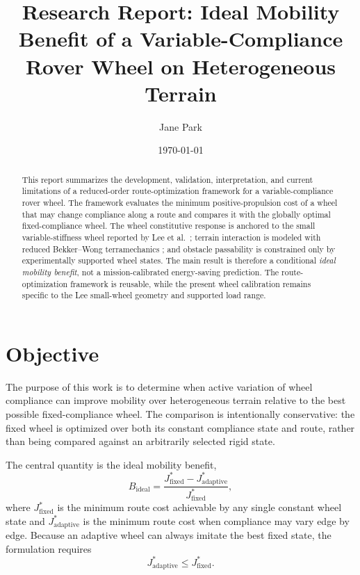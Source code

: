 \documentclass[11pt]{article}
\title{Research Report: Ideal Mobility Benefit of a Variable-Compliance Rover Wheel on Heterogeneous Terrain}
\author{Jane Park}
\date{\today}
\begin{document}
\maketitle

\begin{abstract}
This report summarizes the development, validation, interpretation, and current limitations of a reduced-order route-optimization framework for a variable-compliance rover wheel. The framework evaluates the minimum positive-propulsion cost of a wheel that may change compliance along a route and compares it with the globally optimal fixed-compliance wheel. The wheel constitutive response is anchored to the small variable-stiffness wheel reported by Lee et al.\ \cite{Lee2024}; terrain interaction is modeled with reduced Bekker--Wong terramechanics \cite{Bekker1969,Wong2001,Wong2010}; and obstacle passability is constrained only by experimentally supported wheel states. The main result is therefore a conditional \emph{ideal mobility benefit}, not a mission-calibrated energy-saving prediction. The route-optimization framework is reusable, while the present wheel calibration remains specific to the Lee small-wheel geometry and supported load range.
\end{abstract}

\section{Objective}

The purpose of this work is to determine when active variation of wheel compliance can improve mobility over heterogeneous terrain relative to the best possible fixed-compliance wheel. The comparison is intentionally conservative: the fixed wheel is optimized over both its constant compliance state and route, rather than being compared against an arbitrarily selected rigid state.

The central quantity is the ideal mobility benefit,
\begin{equation}
B_{\mathrm{ideal}}
=
\frac{J_{\mathrm{fixed}}^*-J_{\mathrm{adaptive}}^*}
{J_{\mathrm{fixed}}^*},
\end{equation}
where $J_{\mathrm{fixed}}^*$ is the minimum route cost achievable by any single constant wheel state and $J_{\mathrm{adaptive}}^*$ is the minimum route cost when compliance may vary edge by edge. Because an adaptive wheel can always imitate the best fixed state, the formulation requires
\begin{equation}
J_{\mathrm{adaptive}}^*\le J_{\mathrm{fixed}}^*.
\end{equation}
\end{document}
